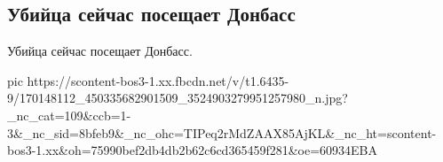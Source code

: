  
 
 
 
 
\subsection{Убийца сейчас посещает Донбасс}

Убийца сейчас посещает Донбасс.

\ifcmt
  pic https://scontent-bos3-1.xx.fbcdn.net/v/t1.6435-9/170148112_450335682901509_3524903279951257980_n.jpg?_nc_cat=109&ccb=1-3&_nc_sid=8bfeb9&_nc_ohc=TIPeq2rMdZAAX85AjKL&_nc_ht=scontent-bos3-1.xx&oh=75990bef2db4db2b62c6cd365459f281&oe=60934EBA
\fi

